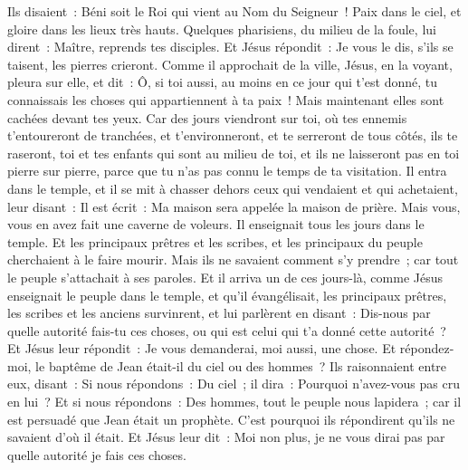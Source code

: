\begin{multicols}{2}
Ils disaient~: Béni soit le Roi qui vient au Nom du Seigneur~! Paix dans le ciel, et gloire dans les lieux très hauts.
Quelques pharisiens, du milieu de la foule, lui dirent~: Maître, reprends tes disciples.
Et Jésus répondit~: Je vous le dis, s'ils se taisent, les pierres crieront.
Comme il approchait de la ville, Jésus, en la voyant, pleura sur elle, et dit~:
Ô, si toi aussi, au moins en ce jour qui t'est donné, tu connaissais les choses qui appartiennent à ta paix~! Mais maintenant elles sont cachées devant tes yeux.
Car des jours viendront sur toi, où tes ennemis t'entoureront de tranchées, et t'environneront, et te serreront de tous côtés,
ils te raseront, toi et tes enfants qui sont au milieu de toi, et ils ne laisseront pas en toi pierre sur pierre, parce que tu n'as pas connu le temps de ta visitation.
Il entra dans le temple, et il se mit à chasser dehors ceux qui vendaient et qui achetaient,
leur disant~: Il est écrit~: Ma maison sera appelée la maison de prière. Mais vous, vous en avez fait une caverne de voleurs.
Il enseignait tous les jours dans le temple. Et les principaux prêtres et les scribes, et les principaux du peuple cherchaient à le faire mourir.
Mais ils ne savaient comment s'y prendre~; car tout le peuple s'attachait à ses paroles.
\VerseOne{}Et il arriva un de ces jours-là, comme Jésus enseignait le peuple dans le temple, et qu'il évangélisait, les principaux prêtres, les scribes et les anciens survinrent,
et lui parlèrent en disant~: Dis-nous par quelle autorité fais-tu ces choses, ou qui est celui qui t'a donné cette autorité~?
Et Jésus leur répondit~: Je vous demanderai, moi aussi, une chose. Et répondez-moi,
le baptême de Jean était-il du ciel ou des hommes~?
Ils raisonnaient entre eux, disant~: Si nous répondons~: Du ciel~; il dira~: Pourquoi n'avez-vous pas cru en lui~?
Et si nous répondons~: Des hommes, tout le peuple nous lapidera~; car il est persuadé que Jean était un prophète.
C'est pourquoi ils répondirent qu'ils ne savaient d'où il était.
Et Jésus leur dit~: Moi non plus, je ne vous dirai pas par quelle autorité je fais ces choses.

\end{multicols}
